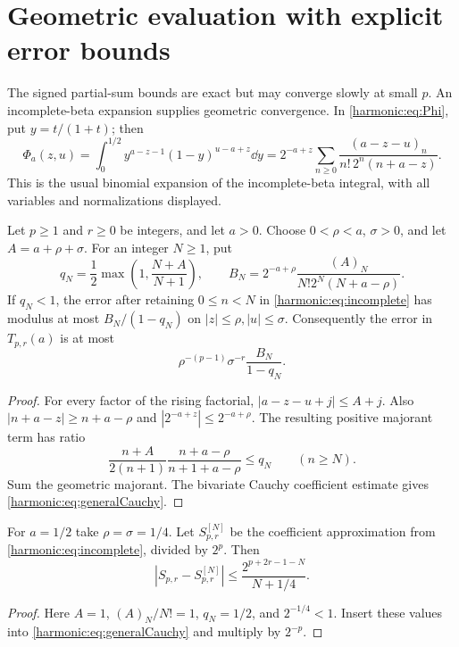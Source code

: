 \section{Geometric evaluation with explicit error bounds}
\label{harmonic:sec:certification}

The signed partial-sum bounds are exact but may converge slowly at small $p$. An incomplete-beta expansion supplies geometric convergence. In \eqref{harmonic:eq:Phi}, put $y=t/(1+t)$; then
\begin{equation}\label{harmonic:eq:incomplete}
 \Phi_a(z,u)=\int_0^{1/2}y^{a-z-1}(1-y)^{u-a+z}\dd y
 =2^{-a+z}\sum_{n\ge0}
 \frac{(a-z-u)_n}{n!\,2^n(n+a-z)}.
\end{equation}
This is the usual binomial expansion of the incomplete-beta integral, with all variables and normalizations displayed.

\begin{theorem}\label{harmonic:thm:cauchy}
Let $p\ge1$ and $r\ge0$ be integers, and let $a>0$. Choose $0<\rho<a$, $\sigma>0$, and let $A=a+\rho+\sigma$. For an integer $N\ge1$, put
\[
 q_N=\frac12\max\left(1,\frac{N+A}{N+1}\right),
 \qquad
 B_N=2^{-a+\rho}\frac{(A)_N}{N!2^N(N+a-\rho)}.
\]
If $q_N<1$, the error after retaining $0\le n<N$ in \eqref{harmonic:eq:incomplete} has modulus at most $B_N/(1-q_N)$ on $|z|\le\rho,|u|\le\sigma$. Consequently the error in $T_{p,r}(a)$ is at most
\begin{equation}\label{harmonic:eq:generalCauchy}
 \rho^{-(p-1)}\sigma^{-r}\frac{B_N}{1-q_N}.
\end{equation}
\end{theorem}
\begin{proof}
For every factor of the rising factorial,
$|a-z-u+j|\le A+j$. Also
$|n+a-z|\ge n+a-\rho$ and
$|2^{-a+z}|\le2^{-a+\rho}$. The resulting positive majorant term has ratio
\[
 \frac{n+A}{2(n+1)}\frac{n+a-\rho}{n+1+a-\rho}\le q_N
 \qquad(n\ge N).
\]
Sum the geometric majorant. The bivariate Cauchy coefficient estimate gives \eqref{harmonic:eq:generalCauchy}.
\end{proof}

\begin{corollary}\label{harmonic:cor:rationalBound}
For $a=1/2$ take $\rho=\sigma=1/4$. Let $S_{p,r}^{[N]}$ be the coefficient approximation from \eqref{harmonic:eq:incomplete}, divided by $2^p$. Then
\begin{equation}\label{harmonic:eq:rationalBound}
 \boxed{\qquad
 |S_{p,r}-S_{p,r}^{[N]}|
 \le\frac{2^{p+2r-1-N}}{N+1/4}.
 \qquad}
\end{equation}
\end{corollary}
\begin{proof}
Here $A=1$, $(A)_N/N!=1$, $q_N=1/2$, and $2^{-1/4}<1$. Insert these values into \eqref{harmonic:eq:generalCauchy} and multiply by $2^{-p}$.
\end{proof}

